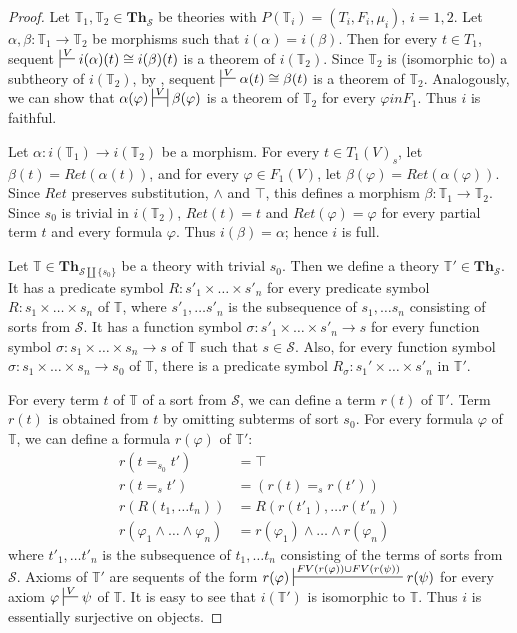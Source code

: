 \documentclass[reqno]{amsart}
\theoremstyle{definition}
\theoremstyle{remark}
\newcommand{\cat}[1]{\mathbf{#1}}
\newcommand{\Th}{\cat{Th}}
\numberwithin{figure}{section}
\begin{document}
\begin{proof}
Let $\mathbb{T}_1,\mathbb{T}_2 \in \Th_\mathcal{S}$ be theories with $P(\mathbb{T}_i) = (T_i,F_i,\mu_i)$, $i = 1,2$.
Let $\alpha,\beta : \mathbb{T}_1 \to \mathbb{T}_2$ be morphisms such that $i(\alpha) = i(\beta)$.
Then for every $t \in T_1$, sequent $\sststile{}{V} i(\alpha)(t) \cong i(\beta)(t)$ is a theorem of $i(\mathbb{T}_2)$.
Since $\mathbb{T}_2$ is (isomorphic to) a subtheory of $i(\mathbb{T}_2)$, by , sequent $\sststile{}{V} \alpha(t) \cong \beta(t)$ is a theorem of $\mathbb{T}_2$.
Analogously, we can show that $\alpha(\varphi) \ssststile{}{V} \beta(\varphi)$ is a theorem of $\mathbb{T}_2$ for every $\varphi in F_1$.
Thus $i$ is faithful.

Let $\alpha : i(\mathbb{T}_1) \to i(\mathbb{T}_2)$ be a morphism.
For every $t \in T_1(V)_s$, let $\beta(t) = Ret(\alpha(t))$, and for every $\varphi \in F_1(V)$, let $\beta(\varphi) = Ret(\alpha(\varphi))$.
Since $Ret$ preserves substitution, $\land$ and $\top$, this defines a morphism $\beta : \mathbb{T}_1 \to \mathbb{T}_2$.
Since $s_0$ is trivial in $i(\mathbb{T}_2)$, $Ret(t) = t$ and $Ret(\varphi) = \varphi$ for every partial term $t$ and every formula $\varphi$.
Thus $i(\beta) = \alpha$; hence $i$ is full.

Let $\mathbb{T} \in \Th_{\mathcal{S} \amalg \{ s_0 \}}$ be a theory with trivial $s_0$.
Then we define a theory $\mathbb{T}' \in \Th_\mathcal{S}$.
It has a predicate symbol $R : s'_1 \times \ldots \times s'_n$ for every predicate symbol $R : s_1 \times \ldots \times s_n$ of $\mathbb{T}$,
    where $s'_1, \ldots s'_n$ is the subsequence of $s_1, \ldots s_n$ consisting of sorts from $\mathcal{S}$.
It has a function symbol $\sigma : s'_1 \times \ldots \times s'_n \to s$ for every function symbol
    $\sigma : s_1 \times \ldots \times s_n \to s$ of $\mathbb{T}$ such that $s \in \mathcal{S}$.
Also, for every function symbol $\sigma : s_1 \times \ldots \times s_n \to s_0$ of $\mathbb{T}$,
    there is a predicate symbol $R_\sigma : s_1' \times \ldots \times s'_n$ in $\mathbb{T}'$.

For every term $t$ of $\mathbb{T}$ of a sort from $\mathcal{S}$, we can define a term $r(t)$ of $\mathbb{T}'$.
Term $r(t)$ is obtained from $t$ by omitting subterms of sort $s_0$.
For every formula $\varphi$ of $\mathbb{T}$, we can define a formula $r(\varphi)$ of $\mathbb{T}'$:
\begin{align*}
r(t =_{s_0} t') & = \top \\
r(t =_s t') & = (r(t) =_s r(t')) \\
r(R(t_1, \ldots t_n)) & = R(r(t'_1), \ldots r(t'_n)) \\
r(\varphi_1 \land \ldots \land \varphi_n) & = r(\varphi_1) \land \ldots \land r(\varphi_n)
\end{align*}
where $t'_1, \ldots t'_n$ is the subsequence of $t_1, \ldots t_n$ consisting of the terms of sorts from $\mathcal{S}$.
Axioms of $\mathbb{T}'$ are sequents of the form $r(\varphi) \sststile{}{FV(r(\varphi)) \cup FV(r(\psi))} r(\psi)$ for every axiom $\varphi \sststile{}{V} \psi$ of $\mathbb{T}$.
It is easy to see that $i(\mathbb{T}')$ is isomorphic to $\mathbb{T}$.
Thus $i$ is essentially surjective on objects.
\end{proof}
\end{document}
